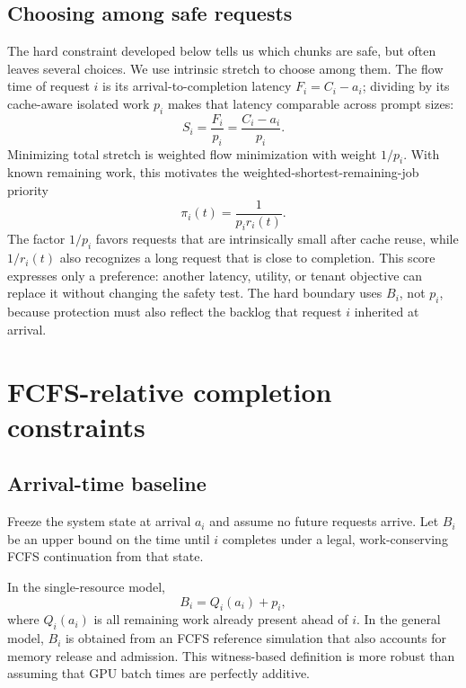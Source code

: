 \documentclass{article}
\begin{document}
\subsection{Choosing among safe requests}

The hard constraint developed below tells us which chunks are safe, but often
leaves several choices.  We use intrinsic stretch to choose among them.  The
flow time of request $i$ is its arrival-to-completion latency
$F_i=C_i-a_i$; dividing by its cache-aware isolated work $p_i$ makes that
latency comparable across prompt sizes:
\begin{equation}
    S_i=\frac{F_i}{p_i}=\frac{C_i-a_i}{p_i}.
\end{equation}
Minimizing total stretch is weighted flow minimization with weight $1/p_i$.
With known remaining work, this motivates the weighted-shortest-remaining-job
priority
\begin{equation}
    \pi_i(t)=\frac{1}{p_i r_i(t)}.
    \label{eq:soft-score}
\end{equation}
The factor $1/p_i$ favors requests that are intrinsically small after cache
reuse, while $1/r_i(t)$ also recognizes a long request that is close to
completion.  This score expresses only a preference: another latency, utility,
or tenant objective can replace it without changing the safety test.  The hard
boundary uses $B_i$, not $p_i$, because protection must also reflect the backlog
that request $i$ inherited at arrival.

\section{FCFS-relative completion constraints}
\label{sec:constraints}

\subsection{Arrival-time baseline}

Freeze the system state at arrival $a_i$ and assume no future requests arrive.
Let $B_i$ be an upper bound on the time until $i$ completes under a legal,
work-conserving FCFS continuation from that state.

In the single-resource model,
\begin{equation}
    B_i=Q_i(a_i)+p_i,
    \label{eq:baseline-simple}
\end{equation}
where $Q_i(a_i)$ is all remaining work already present ahead of $i$.  In the
general model, $B_i$ is obtained from an FCFS reference simulation that also
accounts for memory release and admission.  This witness-based definition is
more robust than assuming that GPU batch times are perfectly additive.
\end{document}
